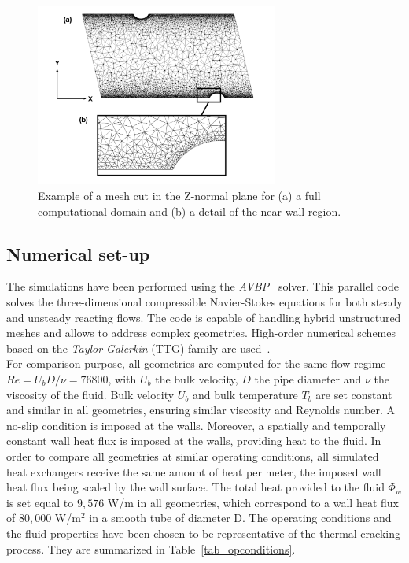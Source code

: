 \begin{figure}[ht]
\centering
\includegraphics[width=8cm]{fig/applications/optim/mert_mesh2.pdf}
\caption{Example of a mesh cut in the Z-normal plane for (a) a full computational domain and (b) a detail of the near wall region.}
\label{mesh}
\end{figure}

\subsection{Numerical set-up}

The simulations have been performed using the \emph{AVBP}~\cite{gicquel2011} solver. This parallel code solves the three-dimensional compressible Navier-Stokes equations for both steady and unsteady reacting flows. The code is capable of handling hybrid unstructured meshes and allows to address complex geometries. High-order numerical schemes based on the \emph{Taylor-Galerkin} (TTG) family are used~\cite{quartapelle1993}.\\

For comparison purpose, all geometries are computed for the same flow regime $Re = U_b D / \nu = 76800$, with $U_b$ the bulk velocity, $D$ the pipe diameter and $\nu$ the viscosity of the fluid. Bulk velocity $U_b$ and bulk temperature $T_b$ are set constant and similar in all geometries, ensuring similar viscosity and Reynolds number. A no-slip condition is imposed at the walls. Moreover, a spatially and temporally constant wall heat flux is imposed at the walls, providing heat to the fluid. In order to compare all geometries at similar operating conditions, all simulated heat exchangers receive the same amount of heat per meter, the imposed wall heat flux being scaled by the wall surface. The total heat provided to the fluid $\Phi_w$ is set equal to $9,576$ W/m in all geometries, which correspond to a wall heat flux of $80,000$ W/m$^2$ in a smooth tube of diameter D. The operating conditions and the fluid properties have been chosen to be representative of the thermal cracking process. They are summarized in Table~\ref{tab_opconditions}.\\

